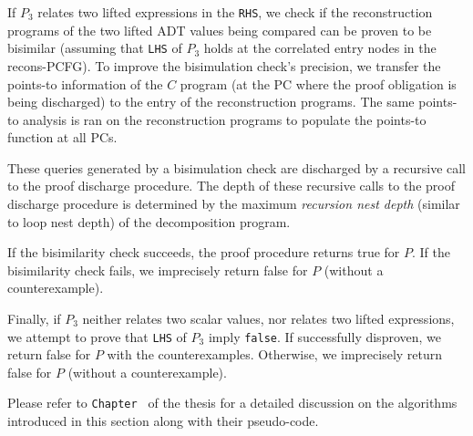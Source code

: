 If $P_3$ relates two lifted
expressions in
the {\tt RHS},
we check if the reconstruction
programs of the two lifted ADT values being
compared can be proven to be bisimilar (assuming that
{\tt LHS} of $P_3$ holds at the correlated entry nodes
in the recons-PCFG).
To improve
the bisimulation
check's precision, we transfer the points-to information of the $C$ program
(at the PC where the proof obligation is being discharged) to the entry
of the reconstruction programs. The same points-to analysis is ran on the
reconstruction programs to populate the points-to function at all PCs.

These queries
generated by a bisimulation check are discharged
by a recursive call to the proof discharge procedure.
The depth of these recursive calls to the
proof discharge procedure is determined by
the maximum {\em recursion nest depth} (similar
to loop nest depth) of the decomposition
program.

If the bisimilarity check succeeds, the proof procedure returns
true for $P$.
If the bisimilarity check fails,
we imprecisely return false for $P$ (without a counterexample).

Finally, if $P_3$ neither
relates two scalar values, nor relates two lifted expressions,
we attempt to prove that {\tt LHS} of $P_3$ imply {\tt false}.
If successfully disproven, we return false for $P$ with the counterexamples.
Otherwise, we imprecisely return false for $P$ (without a counterexample).

Please refer to {\tt Chapter \ThesisChapterAlgo{}} of the thesis for a
detailed discussion on the algorithms introduced in this section along
with their pseudo-code.